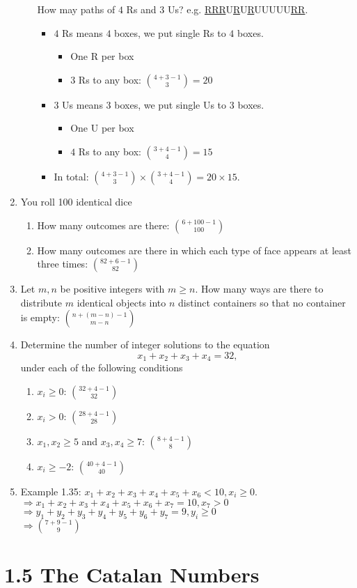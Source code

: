 \documentclass[letter]{book}
\begin{document}
\begin{enumerate}
\begin{enumerate}
        How may paths of $4$ Rs and $3$ Us? e.g. \underline{RRR}U\underline{R}U\underline{R}UUUUU\underline{RR}.
        \begin{itemize}
            \item $4$ Rs means $4$ boxes, we put single Rs to $4$ boxes.
            \begin{itemize}
                \item One R per box
                \item $3$ Rs to any box: $\binom{4+3-1}{3}=20$
            \end{itemize}
            \item $3$ Us means $3$ boxes, we put single Us to $3$ boxes.
            \begin{itemize}
                \item One U per box
                \item $4$ Rs to any box: $\binom{3+4-1}{4}=15$
            \end{itemize}
            \item In total: $\binom{4+3-1}{3}\times \binom{3+4-1}{4}=20\times 15$.
        \end{itemize}
    \end{enumerate}
    \item You roll 100 identical dice
    \begin{enumerate}
        \item How many outcomes are there: $\binom{6+100-1}{100}$
        \item How many outcomes are there in which each type of face appears at least three times: $\binom{82+6-1}{82}$
    \end{enumerate}
    \item Let $m,n$ be positive integers with $m\geq n$. How many ways are there to distribute $m$ identical objects into $n$ distinct containers so that no container is empty: $\binom{n+(m-n)-1}{m-n}$
    \item Determine the number of integer solutions to the equation
    $$
    x_1+x_2+x_3+x_4=32,
    $$
    under each of the following conditions
    \begin{enumerate}
        \item $x_i\geq 0$: $\binom{32+4-1}{32}$
        \item $x_i> 0$: $\binom{28+4-1}{28}$
        \item $x_1,x_2\geq 5$ and $x_3,x_4\geq 7$: $\binom{8+4-1}{8}$
        \item $x_i\geq -2$: $\binom{40+4-1}{40}$
    \end{enumerate}
    \item Example 1.35: $x_1+x_2+x_3+x_4+x_5+x_6<10,x_i\geq 0$.\\
    $\Rightarrow x_1+x_2+x_3+x_4+x_5+x_6+x_7=10,x_7>0$\\
    $\Rightarrow y_1+y_2+y_3+y_4+y_5+y_6+y_7=9,y_i\geq 0$\\
    $\Rightarrow \binom{7+9-1}{9}$
\end{enumerate}
\section*{1.5 The Catalan Numbers}
\end{document}
